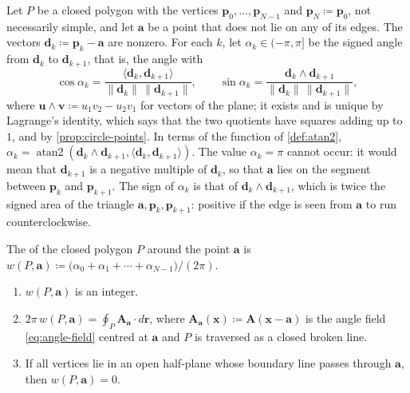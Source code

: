 Let $P$ be a closed polygon with the vertices $\mathbf p_0,\ldots,\mathbf p_{N-1}$ and $\mathbf p_N\coloneqq\mathbf p_0$, not necessarily simple, and let $\mathbf a$ be a point that does not lie on any of its edges. The vectors $\mathbf d_k\coloneqq\mathbf p_k-\mathbf a$ are nonzero. For each $k$, let $\alpha_k\in(-\pi,\pi]$ be the signed angle from $\mathbf d_k$ to $\mathbf d_{k+1}$, that is, the angle with
\[
\cos\alpha_k=\frac{\langle\mathbf d_k,\mathbf d_{k+1}\rangle}{\|\mathbf d_k\|\,\|\mathbf d_{k+1}\|},\qquad\sin\alpha_k=\frac{\mathbf d_k\wedge\mathbf d_{k+1}}{\|\mathbf d_k\|\,\|\mathbf d_{k+1}\|},
\]
where $\mathbf u\wedge\mathbf v\coloneqq u_1v_2-u_2v_1$ for vectors of the plane; it exists and is unique by Lagrange's identity, which says that the two quotients have squares adding up to $1$, and by \cref{prop:circle-points}. In terms of the function of \cref{def:atan2}, $\alpha_k=\operatorname{atan2}(\mathbf d_k\wedge\mathbf d_{k+1},\langle\mathbf d_k,\mathbf d_{k+1}\rangle)$. The value $\alpha_k=\pi$ cannot occur: it would mean that $\mathbf d_{k+1}$ is a negative multiple of $\mathbf d_k$, so that $\mathbf a$ lies on the segment between $\mathbf p_k$ and $\mathbf p_{k+1}$. The sign of $\alpha_k$ is that of $\mathbf d_k\wedge\mathbf d_{k+1}$, which is twice the signed area of the triangle $\mathbf a,\mathbf p_k,\mathbf p_{k+1}$: positive if the edge is seen from $\mathbf a$ to run counterclockwise.

\begin{definition}
\label{def:winding-number}
The  of the closed polygon $P$ around the point $\mathbf a$ is $w(P,\mathbf a)\coloneqq\bigl(\alpha_0+\alpha_1+\cdots+\alpha_{N-1}\bigr)/(2\pi)$.
\end{definition}

\begin{proposition}
\label{prop:winding}
\leavevmode
\begin{enumerate}
\item $w(P,\mathbf a)$ is an integer.
\item $2\pi\,w(P,\mathbf a)=\oint_P\mathbf A_{\mathbf a}\cdot d\mathbf r$, where $\mathbf A_{\mathbf a}(\mathbf x)\coloneqq\mathbf A(\mathbf x-\mathbf a)$ is the angle field \eqref{eq:angle-field} centred at $\mathbf a$ and $P$ is traversed as a closed broken line.
\item If all vertices lie in an open half-plane whose boundary line passes through $\mathbf a$, then $w(P,\mathbf a)=0$.
\end{enumerate}
\end{proposition}

